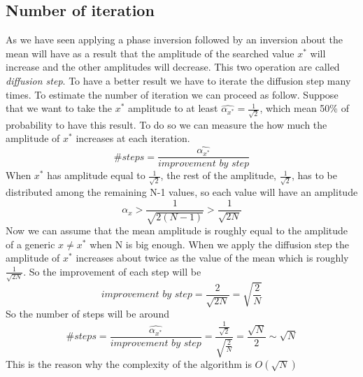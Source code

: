 \documentclass[main.tex]{subfiles}
\begin{document}
\subsection{Number of iteration}
As we have seen applying a phase inversion followed by an inversion about the mean will have as a result that the amplitude of the searched value $x^*$ will increase and the other amplitudes will decrease. This two operation are called \textit{diffusion step}.
To have a better result we have to iterate the diffusion step many times. To estimate the number of iteration we can proceed as follow. 
Suppose that we want to take the $x^*$ amplitude to at least $\widehat{\alpha_{x^{*}}}=\frac{1}{\sqrt{2}}$, which mean 50\% of probability to have this result.
To do so we can measure the how much the amplitude of $x^*$ increases at each iteration.
$$\textit{\#steps}=\frac{\widehat{\alpha_{x^{*}}}}{\textit{improvement by step}}$$
When $x^*$ has amplitude equal to $\frac{1}{\sqrt{2}}$, the rest of the amplitude, $\frac{1}{\sqrt{2}}$, has to be distributed among the remaining N-1 values, so each value will have an amplitude
$$ \alpha_x >\frac{1}{\sqrt{2(N-1)}}> \frac{1}{\sqrt{2N}}$$
Now we can assume that the mean amplitude is roughly equal to the amplitude of a generic $x\neq x^*$ when N is big enough.
When we apply the diffusion step the amplitude of $x^*$ increases about twice as the value of the mean which is roughly $\frac{1}{\sqrt{2N}}$. So the improvement of each step will be
\begin{equation}
\textit{improvement by step}=\frac{2}{\sqrt{2N}}=\sqrt{\frac{2}{N}}
\end{equation}
So the number of steps will be around
\begin{equation}
\textit{\#steps}=\frac{\widehat{\alpha_{x^{*}}}}{\textit{improvement by step}}=\frac{\frac{1}{\sqrt{2}}}{\sqrt{\frac{2}{N}}}=\frac{\sqrt{N}}{2}\sim\sqrt{N}
\end{equation}
This is the reason why the complexity of the algorithm is $O(\sqrt{N})$
\end{document}
